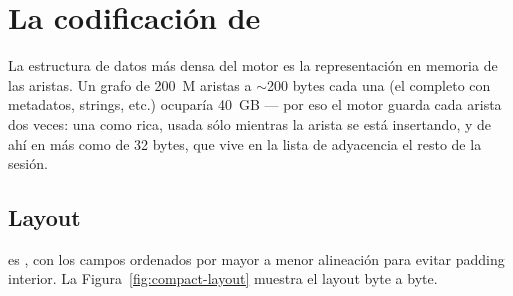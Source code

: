 \chapter{La codificación de \Compact{}}
\label{ch:compact-relation}

La estructura de datos más densa del motor es la representación
en memoria de las aristas. Un grafo de 200~M aristas a $\sim$200
bytes cada una (el  completo con metadatos, strings,
etc.) ocuparía 40~GB --- por eso el motor guarda cada arista dos
veces: una como  rica, usada sólo mientras la
arista se está insertando, y de ahí en más como \Compact{} de 32
bytes, que vive en la lista de adyacencia el resto de la sesión.

\section{Layout}

\Compact{} es \code{\#[repr(C)]}, con los campos ordenados por
mayor a menor alineación para evitar padding interior. La
Figura~\ref{fig:compact-layout} muestra el layout byte a byte.

